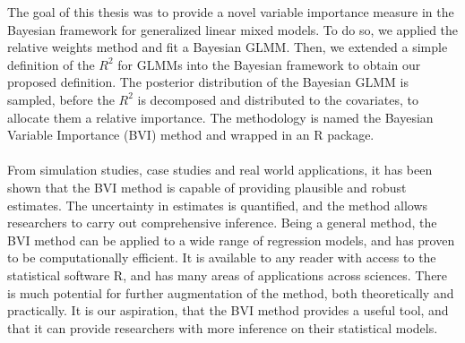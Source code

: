 The goal of this thesis was to provide a novel variable importance measure in the Bayesian framework for generalized linear mixed models. To do so, we applied the relative weights method and fit a Bayesian GLMM. Then, we extended a simple definition of the $R^2$ for GLMMs into the Bayesian framework to obtain our proposed definition. The posterior distribution of the Bayesian GLMM is sampled, before the $R^2$ is decomposed and distributed to the covariates, to allocate them a relative importance. The methodology is named the Bayesian Variable Importance (BVI) method and wrapped in an R package. 
\\
\\
From simulation studies, case studies and real world applications, it has been shown that the BVI method is capable of providing plausible and robust estimates. The uncertainty in estimates is quantified, and the method allows researchers to carry out comprehensive inference. Being a general method, the BVI method can be applied to a wide range of regression models, and has proven to be computationally efficient. It is available to any reader with access to the statistical software R, and has many areas of applications across sciences. There is much potential for further augmentation of the method, both theoretically and practically. It is our aspiration, that the BVI method provides a useful tool, and that it can provide researchers with more inference on their statistical models.
